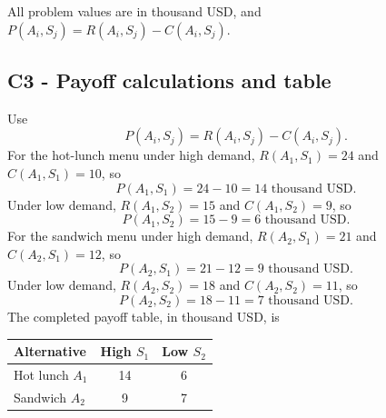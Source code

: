 {	All problem values are in thousand USD, and \(P(A_i,S_j)=R(A_i,S_j)-C(A_i,S_j)\).

	\vspace{-3mm}
	
	\label{subsec:school-lunch-service-c1-c3-c3-payoff-calculations-table}
	\subsection*{C3 - Payoff calculations and table }
	
	Use
	\[
	P(A_i,S_j)=R(A_i,S_j)-C(A_i,S_j).
	\]
	For the hot-lunch menu under high demand, \(R(A_1,S_1)=24\) and \(C(A_1,S_1)=10\), so
	\[P(A_1,S_1)=24-10=14\text{ thousand USD}.\]
	Under low demand, \(R(A_1,S_2)=15\) and \(C(A_1,S_2)=9\), so
	\[P(A_1,S_2)=15-9=6\text{ thousand USD}.\]
	For the sandwich menu under high demand, \(R(A_2,S_1)=21\) and \(C(A_2,S_1)=12\), so
	\[P(A_2,S_1)=21-12=9\text{ thousand USD}.\]
	Under low demand, \(R(A_2,S_2)=18\) and \(C(A_2,S_2)=11\), so
	\[P(A_2,S_2)=18-11=7\text{ thousand USD}.\]
	The completed payoff table, in thousand USD, is
	\begin{center}
	\begin{tabular}{lcc}
	\toprule
	Alternative & High \(S_1\) & Low \(S_2\)\\
	\midrule
	Hot lunch \(A_1\)&14&6\\
	Sandwich \(A_2\)&9&7\\
	\bottomrule
	\end{tabular}
	\end{center}

	\vspace{-8mm}

	}

